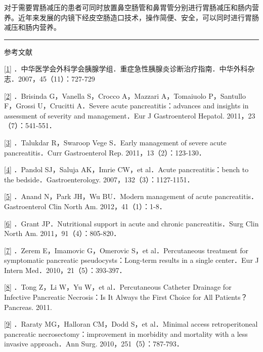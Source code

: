 对于需要胃肠减压的患者可同时放置鼻空肠管和鼻胃管分别进行胃肠减压和肠内营养。近年来发展的内镜下经皮空肠造口技术，操作简便、安全，可以同时进行胃肠减压和肠内营养。

\begin{center}\rule{0.5\linewidth}{\linethickness}\end{center}

参考文献

\protect\hyperlink{text00021.htmlux5cux23ch1-20-back}{{[}1{]}}
．中华医学会外科学会胰腺学组．重症急性胰腺炎诊断治疗指南．中华外科杂志．2007，45（11）：727-729

\protect\hyperlink{text00021.htmlux5cux23ch2-20-back}{{[}2{]}}
．Brisinda G，Vanella S，Crocco A，Mazzari A，Tomaiuolo P，Santullo
F，Grossi U，Crucitti A．Severe acute pancreatitis：advances and
insights in assessment of severity and management．Eur J Gastroenterol
Hepatol. 2011，23（7）：541-551．

\protect\hyperlink{text00021.htmlux5cux23ch3-20-back}{{[}3{]}}
．Talukdar R，Swaroop Vege S．Early management of severe acute
pancreatitis．Curr Gastroenterol Rep. 2011，13（2）：123-130．

\protect\hyperlink{text00021.htmlux5cux23ch4-20-back}{{[}4{]}} ．Pandol
SJ，Saluja AK，Imrie CW，et al．Acute pancreatitis：bench to the
bedside．Gastroenterology. 2007，132（3）：1127-1151．

\protect\hyperlink{text00021.htmlux5cux23ch5-20-back}{{[}5{]}} ．Anand
N，Park JH，Wu BU．Modern management of acute
pancreatitis．Gastroenterol Clin North Am. 2012，41（1）：1-8．

\protect\hyperlink{text00021.htmlux5cux23ch6-20-back}{{[}6{]}} ．Grant
JP．Nutritional support in acute and chronic pancreatitis．Surg Clin
North Am. 2011，91（4）：805-820．

\protect\hyperlink{text00021.htmlux5cux23ch7-20-back}{{[}7{]}} ．Zerem
E，Imamovic G，Omerovic S，et al．Percutaneous treatment for symptomatic
pancreatic pseudocysts：Long-term results in a single center．Eur J
Intern Med．2010，21（5）：393-397．

\protect\hyperlink{text00021.htmlux5cux23ch8-20-back}{{[}8{]}} ．Tong
Z，Li W，Yu W，et al．Percutaneous Catheter Drainage for Infective
Pancreatic Necrosis：Is It Always the First Choice for All
Patients？Pancreas. 2011.

\protect\hyperlink{text00021.htmlux5cux23ch9-20-back}{{[}9{]}} ．Raraty
MG，Halloran CM，Dodd S，et al．Minimal access retroperitoneal
pancreatic necrosectomy：improvement in morbidity and mortality with a
less invasive approach．Ann Surg. 2010，251（5）：787-793．

\protect\hypertarget{text00022.html}{}{}

